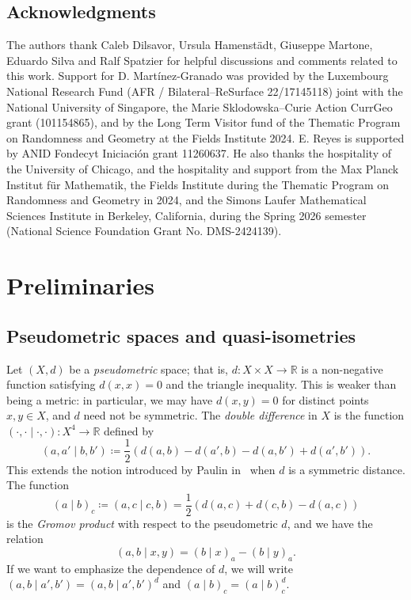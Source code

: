 \documentclass[twoside]{amsart}
\theoremstyle{definition}
\numberwithin{equation}{section}
\numberwithin{theorem}{section}
\newcommand{\gpr}[2]{(#1 \mid#2)}
\begin{document}
\subsection*{Acknowledgments}
The authors thank Caleb Dilsavor, Ursula Hamenst\"adt, Giuseppe Martone, Eduardo Silva and Ralf Spatzier for helpful discussions and comments related to this work. Support for D. Mart\'inez-Granado was provided by the Luxembourg National Research Fund (AFR / Bilateral--ReSurface 22/17145118) joint with the National University of Singapore, the Marie Sklodowska--Curie Action CurrGeo grant (101154865), and by the Long Term Visitor fund of the Thematic Program on Randomness and Geometry at the Fields Institute 2024. E. Reyes is supported by ANID Fondecyt Iniciaci\'on grant 11260637. He also thanks the hospitality of the University of Chicago, and the hospitality and support from the Max Planck Institut für Mathematik, the Fields Institute during the Thematic Program on Randomness and Geometry in 2024, and the Simons Laufer Mathematical Sciences Institute in Berkeley, California, during the Spring 2026 semester (National Science Foundation Grant No. DMS-2424139).











\section{Preliminaries}
\label{sec:preliminaries}
\subsection{Pseudometric spaces and quasi-isometries}\label{subsec:quasiisometries} 
Let $(X,d)$ be a \emph{pseudometric} space; that is, $d \colon X \times X \to \mathbb{R}$ is a non-negative function satisfying $d(x,x)=0$ and the triangle inequality. This is weaker than being a metric: in particular, we may have $d(x,y)=0$ for distinct points $x,y \in X$, and $d$ need not be symmetric.
The \emph{double difference} in $X$ is the function $( \cdot, \cdot \mid \cdot, \cdot ) \colon X^4 \to \mathbb{R}$ defined by
\[
( a, a' \mid b, b' ) \coloneq \frac{1}{2} \left( d(a,b) - d(a',b) - d(a,b')+d(a',b') \right).
\]
This extends the notion introduced
by Paulin in~\cite{paulin96} when $d$ is a symmetric distance. The function
\[
( a \mid b )_c \coloneqq ( a,c \mid c, b) =
\frac{1}{2} (d(a,c) + d(c,b) - d(a,c))
\]
is the \emph{Gromov product} with respect to the pseudometric $d$, and we have the relation
\[
( a, b \mid x, y) = ( b \mid x )_a - ( b \mid y )_a.
\]
If we want to emphasize the dependence of $d$, we will write $\gpr{a,b}{a',b'}=\gpr{a,b}{a',b'}^d$ and $( a \mid b )_c= ( a\mid b )^d_c$.
\end{document}
